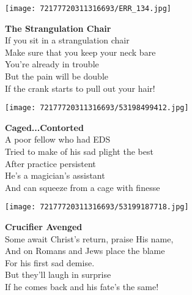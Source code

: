 \documentclass[10pt,letterpaper]{article}
\begin{document}
\begin{center}
\texttt{[image: 72177720311316693/ERR\_134.jpg]}
\end{center}

\begin{center}
\textbf{The Strangulation Chair}\\
\vskip 0.2in
If you sit in a strangulation chair\\
Make sure that you keep your neck bare\\
You're already in trouble\\
But the pain will be double\\
If the crank starts to pull out your hair!\\
\end{center}
\pagebreak

\begin{center}\texttt{[image: 72177720311316693/53198499412.jpg]}
\end{center}
\begin{center}
\textbf{Caged...Contorted}\\
\vskip 0.2in
A poor fellow who had EDS\\
Tried to make of his sad plight the best\\
After practice persistent\\
He's a magician's assistant\\
And can squeeze from a cage with finesse\\
\end{center}
\pagebreak

\begin{center}
\texttt{[image: 72177720311316693/53199187718.jpg]}
\end{center}

\begin{center}
\textbf{Crucifier Avenged}\\
\vskip 0.2in
Some await Christ's return, praise His name,\\
And on Romans and Jews place the blame\\
For his first sad demise.\\
But they'll laugh in surprise\\
If he comes back and his fate's the same!\\
\end{center}
\pagebreak
\end{document}
